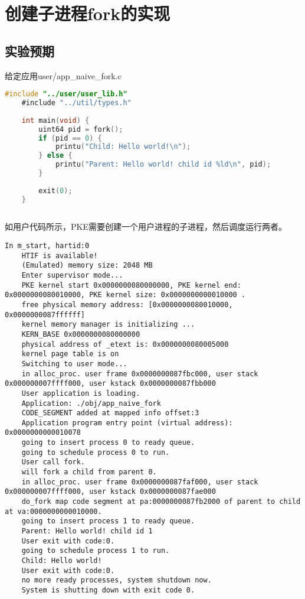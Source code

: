 \section{创建子进程fork的实现}

\subsection{实验预期}

给定应用user/app\_naive\_fork.c

\begin{lstlisting}[caption={用户态应用app\_naive\_fork.c}, label={lst:app_naive_fork}, language=C]
    #include "../user/user_lib.h"
    #include "../util/types.h"
    
    int main(void) {
        uint64 pid = fork();
        if (pid == 0) {
            printu("Child: Hello world!\n");
        } else {
            printu("Parent: Hello world! child id %ld\n", pid);
        }
    
        exit(0);
    }
       
\end{lstlisting}

如用户代码所示，PKE需要创建一个用户进程的子进程，然后调度运行两者。

\begin{lstlisting}[caption={lab7实验结果（移植K210前）}]
    In m_start, hartid:0
    HTIF is available!
    (Emulated) memory size: 2048 MB
    Enter supervisor mode...
    PKE kernel start 0x0000000080000000, PKE kernel end: 0x0000000080010000, PKE kernel size: 0x0000000000010000 .
    free physical memory address: [0x0000000080010000, 0x0000000087ffffff]
    kernel memory manager is initializing ...
    KERN_BASE 0x0000000080000000
    physical address of _etext is: 0x0000000080005000
    kernel page table is on
    Switching to user mode...
    in alloc_proc. user frame 0x0000000087fbc000, user stack 0x000000007ffff000, user kstack 0x0000000087fbb000
    User application is loading.
    Application: ./obj/app_naive_fork
    CODE_SEGMENT added at mapped info offset:3
    Application program entry point (virtual address): 0x0000000000010078
    going to insert process 0 to ready queue.
    going to schedule process 0 to run.
    User call fork.
    will fork a child from parent 0.
    in alloc_proc. user frame 0x0000000087faf000, user stack 0x000000007ffff000, user kstack 0x0000000087fae000
    do_fork map code segment at pa:0000000087fb2000 of parent to child at va:0000000000010000.
    going to insert process 1 to ready queue.
    Parent: Hello world! child id 1
    User exit with code:0.
    going to schedule process 1 to run.
    Child: Hello world!
    User exit with code:0.
    no more ready processes, system shutdown now.
    System is shutting down with exit code 0.    
\end{lstlisting}

